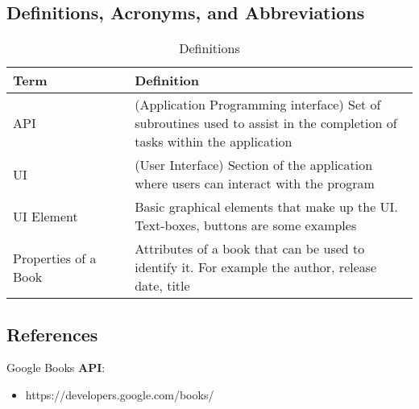 \documentclass[12pt]{article}
\begin{document}
    \subsection{Definitions, Acronyms, and Abbreviations}
    \label{sub:definitions_acronyms_and_abbreviations}
    \begin{table}[H]
        \begin{center}
            \begin{tabular}{| p{0.30\linewidth} | p{0.70\linewidth} |}
                \hline
                \textbf{Term} & \textbf{Definition}\\
                \hline
                API & (Application Programming interface) Set of subroutines used to assist in the completion of tasks within the application\\
                UI & (User Interface) Section of the application where users can interact with the program\\
                UI Element & Basic graphical elements that make up the UI. Text-boxes, buttons are some examples\\
                Properties of a Book & Attributes of a book that can be used to identify it. For example the author, release date, title \\ 
                \hline
            \end{tabular}
            \caption{Definitions} \label{tab:Defs}
        \end{center}
    \end{table}
    
    \subsection{References}
    \label{sub:references}
        Google Books \textbf{API}: 
        \begin{itemize}
            \item https://developers.google.com/books/
        \end{itemize}
    
\end{document}
